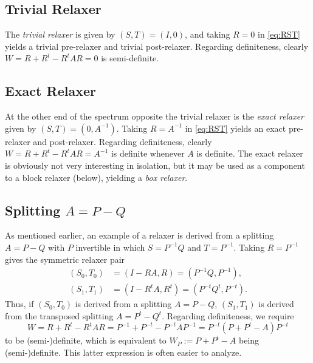 \documentclass{article}
\begin{document}
\subsection{Trivial Relaxer}

The \emph{trivial relaxer} is given by $\left( S, T \right) = \left( I, 0 \right)$, and taking $R = 0$ in \eqref{eq:RST} yields a trivial pre-relaxer and trivial post-relaxer. Regarding definiteness, clearly $W = R + R^t - R^t A R = 0$ is semi-definite.

\subsection{Exact Relaxer}

At the other end of the spectrum opposite the trivial relaxer is the \emph{exact relaxer} given by $\left( S, T \right) = \left( 0, A^{-1} \right)$. Taking $R = A^{-1}$ in \eqref{eq:RST} yields an exact pre-relaxer and post-relaxer.  Regarding definiteness, clearly $W = R + R^t - R^t A R = A^{-1}$ is definite whenever $A$ is definite. The exact relaxer is obviously not very interesting in isolation, but it may be used as a component to a block relaxer (below), yielding a \emph{box relaxer}.

\subsection{Splitting $A = P - Q$}

As mentioned earlier, an example of a relaxer is derived from a splitting $A = P - Q$ with $P$ invertible in which $S = P^{-1} Q$ and $T = P^{-1}$. Taking $R = P^{-1}$ gives the symmetric relaxer pair
\begin{align*}
\left( S_0, T_0 \right) & = \left( I - R A, R \right) = \left( P^{-1} Q, P^{-1} \right), \\
\left( S_1, T_1 \right) & = \left( I - R^t A, R^t \right) = \left( P^{-t} Q^t, P^{-t} \right).
\end{align*}
Thus, if $\left( S_0, T_0 \right)$ is derived from a splitting $A = P - Q$, $\left( S_1, T_1 \right)$ is derived from the transposed splitting $A = P^t - Q^t$. Regarding definiteness, we require
\begin{equation*}
W = R + R^t - R^t A R = P^{-1} + P^{-t} - P^{-t} A P^{-1} = P^{-t} \left( P + P^t - A \right) P^{-t}
\end{equation*}
to be (semi-)definite, which is equivalent to $W_P := P + P^t - A$ being (semi-)definite. This latter expression is often easier to analyze.
\end{document}
